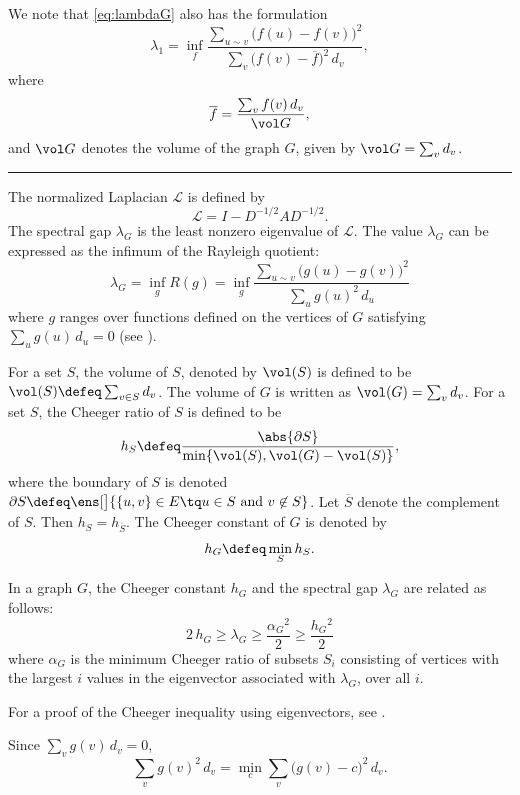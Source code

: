 We note that \ref{eq:lambdaG} also has the formulation
\[
\lambda_1 = \inf_f \frac{\sum_{u \sim v} \big( f(u) - f(v) \big)^2}{\sum_v \big( f(v) - \overline{f} \big)^2 \, d_v},
\]
where 
\[
\overline{f} = \frac{\sum_v f(v) \, d_v}{\vol G},
\]
and $\vol G$ denotes the volume of the graph $G$, given by $\vol G = \sum_v d_v$.

\hrule

\cite[Sec. 2]{ji_fourth_2010} The normalized Laplacian $\mathcal{L}$ is defined by
\[
\mathcal{L} = I - D^{-1/2} A D^{-1/2}.
\]
The spectral gap $\lambda_G$ is the least nonzero eigenvalue of $\mathcal{L}$. The value $\lambda_G$ can be expressed as the infimum of the Rayleigh quotient:
\[
\lambda_G = \inf_g R(g) = \inf_g \frac{\sum_{u \sim v} \big( g(u) - g(v) \big)^2}{\sum_u g(u)^2 \, d_u}
\]
where $g$ ranges over functions defined on the vertices of $G$ satisfying $\sum_u g(u) \, d_u = 0$ (see \cite{chung_lectures_nodate}).

For a set $S$, the volume of $S$, denoted by $\vol(S)$ is defined to be $\vol(S) \defeq \sum_{v \in S} d_v$. The volume of $G$ is written as $\vol(G) = \sum_v d_v$. For a set $S$, the Cheeger ratio of $S$ is defined to be
\[
h_S \defeq \frac{\abs{\partial S}}{\min\{ \vol(S), \vol(G) - \vol(S) \}},
\]
where the boundary of $S$ is denoted $\partial S \defeq \ens[\big]{ \{u, v\} \in E \tq u \in S \text{ and } v \not\in S }$.  Let $\overline{S}$ denote the complement of $S$. Then $h_S = h_{\overline{S}}$. The Cheeger constant of $G$ is denoted by
\[
h_G \defeq \min_S h_S.
\] 

\begin{theo}
In a graph $G$, the Cheeger constant $h_G$ and the spectral gap $\lambda_G$ are related as follows:
\[
2 \, h_G \geqslant \lambda_G \geqslant \frac{\alpha_G{}^2}{2} \geqslant \frac{h_G{}^2}{2}
\]
where $\alpha_G$ is the minimum Cheeger ratio of subsets $S_i$ consisting of vertices {\color{red} with the largest $i$ values in the eigenvector} associated with $\lambda_G$, over all $i$. 
\end{theo}

For a proof of the Cheeger inequality using  eigenvectors, see \cite[Sec. 3]{ji_fourth_2010}.

\cite[p. 7]{ji_fourth_2010} Since $\sum_v g(v) \, d_v = 0$,
\[
\sum_v g(v)^2 \, d_v = \min_c \sum_v \big( g(v) - c \big)^2 \, d_v.
\]
